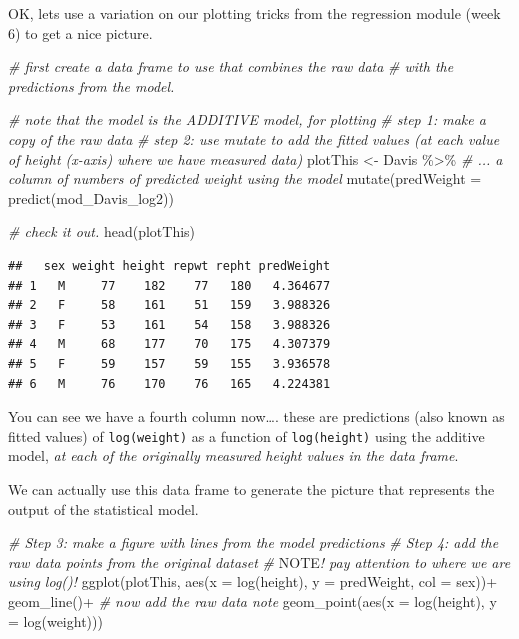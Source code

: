 \documentclass[
]{book}
\newenvironment{Shaded}{\begin{snugshade}}{\end{snugshade}}
\newcommand{\AlertTok}[1]{\textcolor[rgb]{0.94,0.16,0.16}{#1}}
\newcommand{\AttributeTok}[1]{\textcolor[rgb]{0.77,0.63,0.00}{#1}}
\newcommand{\CommentTok}[1]{\textcolor[rgb]{0.56,0.35,0.01}{\textit{#1}}}
\newcommand{\FunctionTok}[1]{\textcolor[rgb]{0.00,0.00,0.00}{#1}}
\newcommand{\NormalTok}[1]{#1}
\newcommand{\OtherTok}[1]{\textcolor[rgb]{0.56,0.35,0.01}{#1}}
\newcommand{\SpecialCharTok}[1]{\textcolor[rgb]{0.00,0.00,0.00}{#1}}
\begin{document}
OK, lets use a variation on our plotting tricks from the regression module (week 6) to get a nice picture.

\begin{Shaded}
\begin{Highlighting}[]
\CommentTok{\# first create a data frame to use that combines the raw data}
\CommentTok{\# with the predictions from the model.}

\CommentTok{\# note that the model is the ADDITIVE model, for plotting}
\CommentTok{\# step 1: make a copy of the raw data}
\CommentTok{\# step 2: use mutate to add the fitted values (at each value of height (x{-}axis) where we have measured data)}
\NormalTok{plotThis }\OtherTok{\textless{}{-}}\NormalTok{ Davis }\SpecialCharTok{\%\textgreater{}\%}
  \CommentTok{\# ... a column of numbers of predicted weight using the model}
  \FunctionTok{mutate}\NormalTok{(}\AttributeTok{predWeight =} \FunctionTok{predict}\NormalTok{(mod\_Davis\_log2))}

\CommentTok{\# check it out.}
\FunctionTok{head}\NormalTok{(plotThis)}
\end{Highlighting}
\end{Shaded}

\begin{verbatim}
##   sex weight height repwt repht predWeight
## 1   M     77    182    77   180   4.364677
## 2   F     58    161    51   159   3.988326
## 3   F     53    161    54   158   3.988326
## 4   M     68    177    70   175   4.307379
## 5   F     59    157    59   155   3.936578
## 6   M     76    170    76   165   4.224381
\end{verbatim}

You can see we have a fourth column now\ldots. these are predictions (also known as fitted values) of \texttt{log(weight)} as a function of \texttt{log(height)} using the additive model, \emph{at each of the originally measured height values in the data frame}.

We can actually use this data frame to generate the picture that represents the output of the statistical model.

\begin{Shaded}
\begin{Highlighting}[]
\CommentTok{\# Step 3: make a figure with lines from the model predictions}
\CommentTok{\# Step 4: add the raw data points from the original dataset}
\CommentTok{\# }\AlertTok{NOTE}\CommentTok{! pay attention to where we are using log()!}
\FunctionTok{ggplot}\NormalTok{(plotThis, }\FunctionTok{aes}\NormalTok{(}\AttributeTok{x =} \FunctionTok{log}\NormalTok{(height), }\AttributeTok{y =}\NormalTok{ predWeight, }\AttributeTok{col =}\NormalTok{ sex))}\SpecialCharTok{+}
  \FunctionTok{geom\_line}\NormalTok{()}\SpecialCharTok{+}
  \CommentTok{\# now add the raw data note}
  \FunctionTok{geom\_point}\NormalTok{(}\FunctionTok{aes}\NormalTok{(}\AttributeTok{x =} \FunctionTok{log}\NormalTok{(height), }\AttributeTok{y =} \FunctionTok{log}\NormalTok{(weight)))}
\end{Highlighting}
\end{Shaded}
\end{document}
